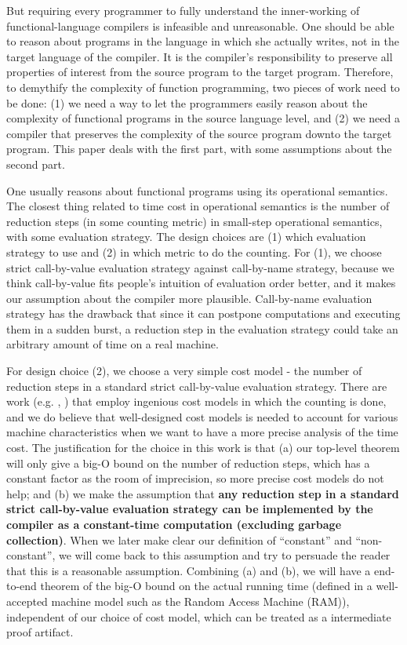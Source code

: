 \documentclass[preprint]{sigplanconf}
\begin{document}
But requiring every programmer to fully understand the inner-working of functional-language compilers is infeasible and unreasonable. One should be able to reason about programs in the language in which she actually writes, not in the target language of the compiler. It is the compiler's responsibility to preserve all properties of interest from the source program to the target program. Therefore, to demythify the complexity of function programming, two pieces of work need to be done: (1) we need a way to let the programmers easily reason about the complexity of functional programs in the source language level, and (2) we need a compiler that preserves the complexity of the source program downto the target program. This paper deals with the first part, with some assumptions about the second part. 

One usually reasons about functional programs using its operational semantics. The closest thing related to time cost in operational semantics is the number of reduction steps (in some counting metric) in small-step operational semantics, with some evaluation strategy. The design choices are (1) which evaluation strategy to use and (2) in which metric to do the counting. For (1), we choose strict call-by-value evaluation strategy against call-by-name strategy, because we think call-by-value fits people's intuition of evaluation order better, and it makes our assumption about the compiler more plausible. Call-by-name evaluation strategy has the drawback that since it can postpone computations and executing them in a sudden burst, a reduction step in the evaluation strategy could take an arbitrary amount of time on a real machine.

For design choice (2), we choose a very simple cost model - the number of reduction steps in a standard strict call-by-value evaluation strategy. There are work (e.g. \cite{blelloch2013cache}, \cite{blelloch1994}) that employ ingenious cost models in which the counting is done, and we do believe that well-designed cost models is needed to account for various machine characteristics when we want to have a more precise analysis of the time cost. The justification for the choice in this work is that (a) our top-level theorem will only give a big-O bound on the number of reduction steps, which has a constant factor as the room of imprecision, so more precise cost models do not help; and (b) we make the assumption that {\bf any reduction step in a standard strict call-by-value evaluation strategy can be implemented by the compiler as a constant-time computation (excluding garbage collection)}. When we later make clear our definition of ``constant'' and ``non-constant'', we will come back to this assumption and try to persuade the reader that this is a reasonable assumption. Combining (a) and (b), we will have a end-to-end theorem of the big-O bound on the actual running time (defined in a well-accepted machine model such as the Random Access Machine (RAM)), independent of our choice of cost model, which can be treated as a intermediate proof artifact.
\end{document}
